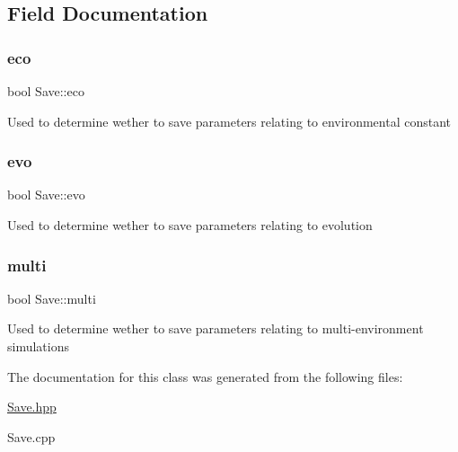 \subsection{Field Documentation}
\mbox{\label{classSave_a1305b08b2fd9b8fd4add77e3effb594f}} 
\subsubsection{\texorpdfstring{eco}{eco}}
{\footnotesize\ttfamily bool Save\+::eco\hspace{0.3cm}{\ttfamily [protected]}}

Used to determine wether to save parameters relating to environmental constant \mbox{\label{classSave_abaa66610fa9870f1e400a58b8732a996}} 
\subsubsection{\texorpdfstring{evo}{evo}}
{\footnotesize\ttfamily bool Save\+::evo\hspace{0.3cm}{\ttfamily [protected]}}

Used to determine wether to save parameters relating to evolution \mbox{\label{classSave_ad1d9db0d8c003efe9e29c497091771e6}} 
\subsubsection{\texorpdfstring{multi}{multi}}
{\footnotesize\ttfamily bool Save\+::multi\hspace{0.3cm}{\ttfamily [protected]}}

Used to determine wether to save parameters relating to multi-\/environment simulations 

The documentation for this class was generated from the following files\+:\begin{DoxyCompactItemize}
\item 
\hyperlink{Save_8hpp}{Save.\+hpp}\item 
Save.\+cpp\end{DoxyCompactItemize}

